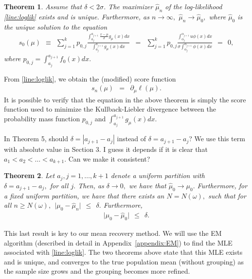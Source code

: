 \documentclass[12pt]{article} %
\newtheorem{theorem}{Theorem}
\newcommand{\comC}[1]{{\noindent  \color{orange}#1}}
\newcommand{\comH}[1]{{\noindent \color{blue}#1}}
\begin{document}
\begin{theorem}\label{thm:mle_exists}
Assume that $\delta<2\sigma$.  The maximizer $\widehat \mu_n$ of the log-likelihood \eqref{line:loglik} exists and is unique. Furthermore, as $n\rightarrow\infty,$ $\widehat \mu_n\rightarrow \widehat \mu_0,$ where $\widehat \mu_0$ is the unique solution to the equation
\begin{eqnarray*}
s_0(\mu) \ \ \equiv \ \   \sum_{j=1}^k p_{0,j} \frac{\int_{a_j}^{a_{j+1}}  \frac{x-\mu}{\sigma} g_{\mu}(x)dx}{\int_{a_j}^{a_{j+1}}  g_{\mu}(x)dx} &=& \sum_{j=1}^k p_{0,j} \frac{\int_{\alpha_j}^{\alpha_{j+1}}  u \phi(x)dx}{\sigma  \int_{\alpha_j}^{\alpha_{j+1}}  \phi(x)dx} \ \ = \ \ 0,
\end{eqnarray*}
where $p_{0,j}=\int_{a_j}^{a_{j+1}}f_0(x)dx.$
\end{theorem}
From \eqref{line:loglik}, we obtain the (modified) score function
\begin{eqnarray*}
s_n(\mu)&=& \partial_\mu \ell(\mu).
\end{eqnarray*}
It is possible to verify that the equation in the above theorem is simply the score function used to minimize the Kullback-Liebler divergence between the probability mass function $p_{0,j}$ and $\int_{a_j}^{a_{j+1}}g_{\mu}(x)dx$.

\comC{In Theorem 5, should $\delta= |a_{j+1}-a_j|$ instead of $\delta=a_{j+1}-a_j$? We use this term with absolute value in Section 3. I guess it depends if it is clear that $a_1 < a_2 < \ldots < a_{k+1}$. Can we make it consistent? }

\begin{theorem}\label{thm:mean_reco}
Let $a_j, j=1, \ldots, k+1$ denote a uniform partition with $\delta=a_{j+1}-a_j,$ for all $j.$  Then, as $\delta\rightarrow 0,$ we have that $\widehat \mu_0 \rightarrow \mu_0.$ Furthermore, for a fixed uniform partition, we have that there exists an $N=N(\omega),$ such that for all $n\geq N(\omega),  \ \ \vert\mu_0 - \widehat \mu_n\vert \ \ \leq \ \ \delta.$   Furthermore, 
\begin{eqnarray*}
\vert\mu_0 - \widehat \mu_0\vert \ \ \leq \ \ \delta. %
\end{eqnarray*}
\end{theorem}
This last result is key to our mean recovery method.  We will use the EM algorithm (described in detail in Appendix~\ref{appendix:EM}) to find the MLE associated with \eqref{line:loglik}.   The two theorems above state that this MLE exists and is unique, and converges to the true population mean (without grouping)  as the sample size grows and the grouping becomes more refined.  
\end{document}
